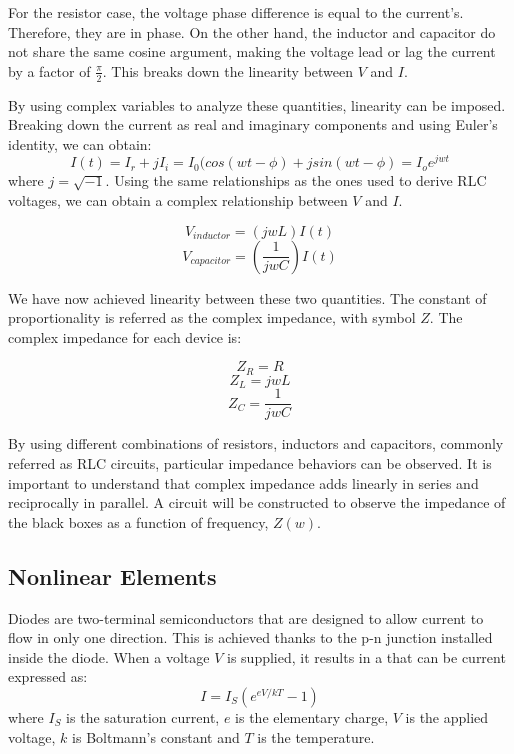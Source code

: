 \documentclass[a4paper]{article}
\begin{document}
For the resistor case, the voltage phase difference is equal to the current's. Therefore, they are in phase. On the other hand, the inductor and capacitor do not share the same cosine argument, making the voltage lead or lag the current by a factor of $\frac{\pi}{2}$. This breaks down the linearity between $V$ and $I$.

By using complex variables to analyze these quantities, linearity can be imposed. Breaking down the current as real and imaginary components and using Euler's identity, we can obtain:
\begin{equation}
I(t)=I_r+jI_i=I_0(cos(wt-\phi)+jsin(wt-\phi)=I_oe^{jwt}
\end{equation}
where $j=\sqrt{-1}$. Using the same relationships as the ones used to derive RLC voltages, we can obtain a complex relationship between $V$ and $I$. 

\begin{figure}[h]
\[V_{inductor}=(jwL)I(t)\]
\[V_{capacitor}=(\frac{1}{jwC})I(t)\]
\end{figure}

We have now achieved linearity between these two quantities. The constant of proportionality is referred as the complex impedance, with symbol $Z$. The complex impedance for each device is:
\begin{figure}[h]
\[Z_R=R\]
\[Z_L=jwL\]
\[Z_C=\frac{1}{jwC}\]
\end{figure}

By using different combinations of resistors, inductors and capacitors, commonly referred as RLC circuits, particular impedance behaviors can be observed. It is important to understand that complex impedance adds linearly in series and reciprocally in parallel. A circuit will be constructed to observe the impedance of the black boxes as a function of frequency, $Z(w)$.

\subsection{Nonlinear Elements}

Diodes are two-terminal semiconductors that are designed to allow current to flow in only one direction. This is achieved thanks to the p-n junction installed inside the diode. When a voltage $V$ is supplied, it results in a that can be current expressed as:
\begin{equation}
I=I_S(e^{eV/kT}-1)
\end{equation}
where $I_S$ is the saturation current, $e$ is the elementary charge, $V$ is the applied voltage, $k$ is Boltmann's constant and $T$ is the temperature. 
\end{document}

